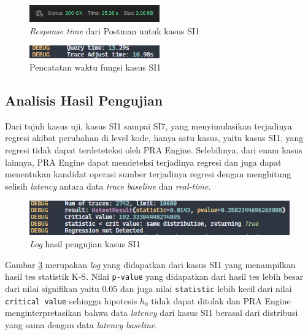 \begin{figure}[!htb]
	\centering
	\includegraphics[width=0.5\textwidth]{resources/ch4/time/1-postman.png}
	\caption{\textit{Response time} dari Postman untuk kasus SI1}
	\label{time_p_1}
\end{figure}

\begin{figure}[!htb]
	\centering
	\includegraphics[width=0.5\textwidth]{resources/ch4/time/1-log.png}
	\caption{Pencatatan waktu fungsi kasus SI1}
	\label{time_l_1}
\end{figure}



\subsection{Analisis Hasil Pengujian}
Dari tujuh kasus uji, kasus SI1 sampai SI7, yang menyimulasikan terjadinya regresi akibat perubahan di level kode, hanya satu kasus, yaitu kasus SI1, yang regresi tidak dapat terdeteteksi oleh PRA Engine. Selebihnya, dari enam kasus lainnya, PRA Engine dapat mendeteksi terjadinya regresi dan juga dapat menentukan kandidat operasi sumber terjadinya regresi dengan menghitung selisih \textit{latency} antara data \textit{trace} \textit{baseline} dan \textit{real-time}. 

\begin{figure}[!htb]
	\centering
	\includegraphics[width=1\textwidth]{resources/ch4/log/1-log.png}
	\caption{\textit{Log} hasil pengujian kasus SI1}
	\label{result_log_1}
\end{figure}

Gambar \ref{result_log_1} merupakan \textit{log} yang didapatkan dari kasus SI1 yang menampilkan hasil tes statistik K-S. Nilai \texttt{p-value} yang didapatkan dari hasil tes lebih besar dari nilai signifikan yaitu 0.05 dan juga nilai \texttt{statistic} lebih kecil dari nilai \texttt{critical value} sehingga hipotesis $h_{0}$ tidak dapat ditolak dan PRA Engine menginterpretasikan bahwa data \textit{latency} dari kasus SI1 berasal dari distribusi yang sama dengan data \textit{latency} \textit{baseline}. 

